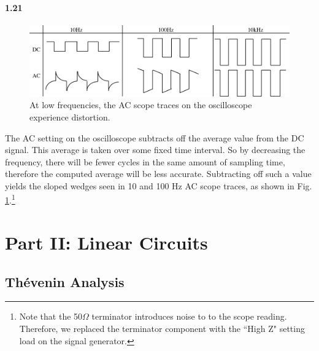 \documentclass[authoryear, 12pt,5p, times]{elsarticle}
\begin{document}
\paragraph{\textbf{1.21}} 
\begin{figure}[t]
\includegraphics[width=\textwidth]{figure/ACweird}
\caption{At low frequencies, the AC scope traces on the oscilloscope experience distortion.}
\label{AC_weird}
\end{figure}
The AC setting on the oscilloscope subtracts off the average value from the DC signal. This average is taken over some fixed time interval. So by decreasing the frequency, there will be fewer cycles in the same amount of sampling time, therefore the computed average will be less accurate. Subtracting off such a value yields the sloped wedges seen in 10 and 100 Hz  AC scope traces, as shown in Fig. \ref{AC_weird}.\footnote{Note that the 50$\Omega$ terminator introduces noise to to the scope reading. Therefore, we replaced the terminator component with the ``High Z" setting load on the signal generator.}
\section{Part II: Linear Circuits}\label{part2}
\subsection*{Thévenin Analysis}
\end{document}
